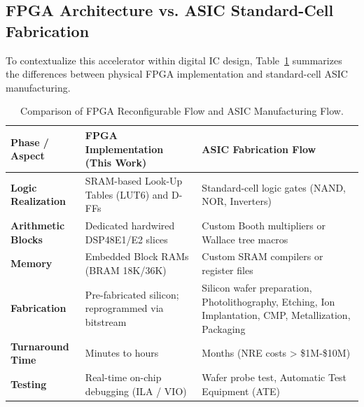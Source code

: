 \documentclass[12pt,a4paper]{article}
\begin{document}
\subsection{FPGA Architecture vs. ASIC Standard-Cell Fabrication}
To contextualize this accelerator within digital IC design, Table~\ref{tab:fpga_vs_asic} summarizes the differences between physical FPGA implementation and standard-cell ASIC manufacturing.
\begin{table}[htbp]
    \centering
    \caption{Comparison of FPGA Reconfigurable Flow and ASIC Manufacturing Flow.}
    \label{tab:fpga_vs_asic}
    \small
    \begin{tabularx}{\textwidth}{lXX}
        \toprule
        \textbf{Phase / Aspect}    & \textbf{FPGA Implementation (This Work)}           & \textbf{ASIC Fabrication Flow}                                                                        \\
        \midrule
        \textbf{Logic Realization} & SRAM-based Look-Up Tables (LUT6) and D-FFs         & Standard-cell logic gates (NAND, NOR, Inverters)                                                      \\
        \textbf{Arithmetic Blocks} & Dedicated hardwired DSP48E1/E2 slices              & Custom Booth multipliers or Wallace tree macros                                                       \\
        \textbf{Memory}            & Embedded Block RAMs (BRAM 18K/36K)                 & Custom SRAM compilers or register files                                                               \\
        \textbf{Fabrication}       & Pre-fabricated silicon; reprogrammed via bitstream & Silicon wafer preparation, Photolithography, Etching, Ion Implantation, CMP, Metallization, Packaging \\
        \textbf{Turnaround Time}   & Minutes to hours                                   & Months (NRE costs > \$1M-\$10M)                                                                       \\
        \textbf{Testing}           & Real-time on-chip debugging (ILA / VIO)            & Wafer probe test, Automatic Test Equipment (ATE)                                                      \\
        \bottomrule
    \end{tabularx}
\end{table}
\end{document}
